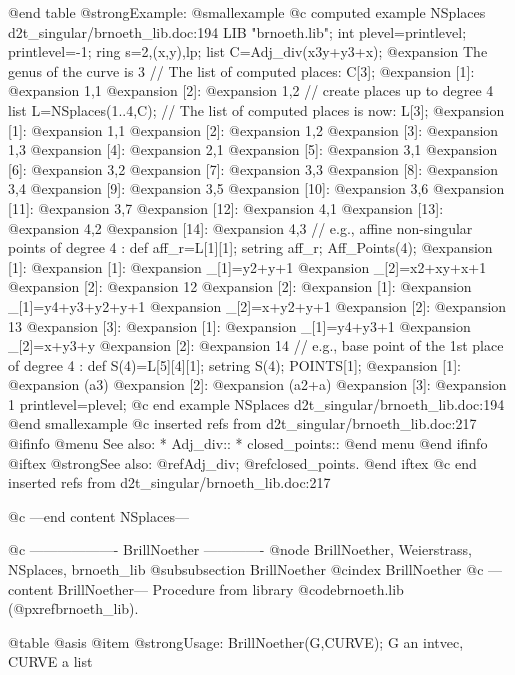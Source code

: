 @end table
@strong{Example:}
@smallexample
@c computed example NSplaces d2t_singular/brnoeth_lib.doc:194 
LIB "brnoeth.lib";
int plevel=printlevel;
printlevel=-1;
ring s=2,(x,y),lp;
list C=Adj_div(x3y+y3+x);
@expansion{} The genus of the curve is 3
// The list of computed places:
C[3];
@expansion{} [1]:
@expansion{}    1,1
@expansion{} [2]:
@expansion{}    1,2
// create places up to degree 4
list L=NSplaces(1..4,C);
// The list of computed places is now:
L[3];
@expansion{} [1]:
@expansion{}    1,1
@expansion{} [2]:
@expansion{}    1,2
@expansion{} [3]:
@expansion{}    1,3
@expansion{} [4]:
@expansion{}    2,1
@expansion{} [5]:
@expansion{}    3,1
@expansion{} [6]:
@expansion{}    3,2
@expansion{} [7]:
@expansion{}    3,3
@expansion{} [8]:
@expansion{}    3,4
@expansion{} [9]:
@expansion{}    3,5
@expansion{} [10]:
@expansion{}    3,6
@expansion{} [11]:
@expansion{}    3,7
@expansion{} [12]:
@expansion{}    4,1
@expansion{} [13]:
@expansion{}    4,2
@expansion{} [14]:
@expansion{}    4,3
// e.g., affine non-singular points of degree 4 :
def aff_r=L[1][1];
setring aff_r;
Aff_Points(4);
@expansion{} [1]:
@expansion{}    [1]:
@expansion{}       _[1]=y2+y+1
@expansion{}       _[2]=x2+xy+x+1
@expansion{}    [2]:
@expansion{}       12
@expansion{} [2]:
@expansion{}    [1]:
@expansion{}       _[1]=y4+y3+y2+y+1
@expansion{}       _[2]=x+y2+y+1
@expansion{}    [2]:
@expansion{}       13
@expansion{} [3]:
@expansion{}    [1]:
@expansion{}       _[1]=y4+y3+1
@expansion{}       _[2]=x+y3+y
@expansion{}    [2]:
@expansion{}       14
// e.g., base point of the 1st place of degree 4 :
def S(4)=L[5][4][1];
setring S(4);
POINTS[1];
@expansion{} [1]:
@expansion{}    (a3)
@expansion{} [2]:
@expansion{}    (a2+a)
@expansion{} [3]:
@expansion{}    1
printlevel=plevel;
@c end example NSplaces d2t_singular/brnoeth_lib.doc:194
@end smallexample
@c inserted refs from d2t_singular/brnoeth_lib.doc:217
@ifinfo
@menu
See also:
* Adj_div::
* closed_points::
@end menu
@end ifinfo
@iftex
@strong{See also:}
@ref{Adj_div};
@ref{closed_points}.
@end iftex
@c end inserted refs from d2t_singular/brnoeth_lib.doc:217

@c ---end content NSplaces---

@c ------------------- BrillNoether -------------
@node BrillNoether, Weierstrass, NSplaces, brnoeth_lib
@subsubsection BrillNoether
@cindex BrillNoether
@c ---content BrillNoether---
Procedure from library @code{brnoeth.lib} (@pxref{brnoeth_lib}).

@table @asis
@item @strong{Usage:}
BrillNoether(G,CURVE); G an intvec, CURVE a list


